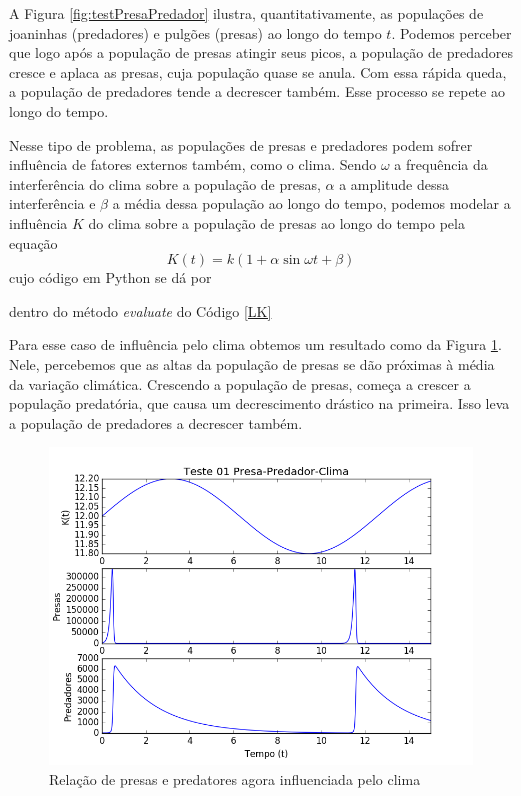         	    A Figura \ref{fig:testPresaPredador} ilustra, quantitativamente, as populações de joaninhas (predadores) e pulgões (presas) ao longo do tempo $t$. Podemos perceber que logo após a população de presas atingir seus picos, a população de predadores cresce e aplaca as presas, cuja população quase se anula. Com essa rápida queda, a população de predadores tende a decrescer também. Esse processo se repete ao longo do tempo.
        	    
        	    Nesse tipo de problema, as populações de presas e predadores podem sofrer influência de fatores externos também, como o clima. Sendo $\omega$ a frequência da interferência do clima sobre a população de presas, $\alpha$ a amplitude dessa interferência e $\beta$ a média dessa população ao longo do tempo, podemos modelar a influência $K$ do clima sobre a população de presas ao longo do tempo pela equação
        	    \begin{equation}
        	        K(t) = k(1 + \alpha\sin{\omega t} + \beta)
        	    \end{equation}
        	    cujo código em Python se dá por 
        	    
        	    
        	    
        	    dentro do método \textit{evaluate} do Código \ref{LK}
        	    
        	    Para esse caso de influência pelo clima obtemos um resultado como da Figura \ref{fig:LCK}. Nele, percebemos que as altas da população de presas se dão próximas à média da variação climática. Crescendo a população de presas, começa a crescer a população predatória, que causa um decrescimento drástico na primeira. Isso leva a população de predadores a decrescer também.
        	    
        	    \begin{figure}[H]
        	        \centering
        	        \includegraphics[scale=.6]{resultsCodigos/testePresaPredadorClima01ParaTmax100.png}
        	        \caption{Relação de presas e predatores agora influenciada pelo clima}
        	        \label{fig:LCK}
        	    \end{figure}
    
